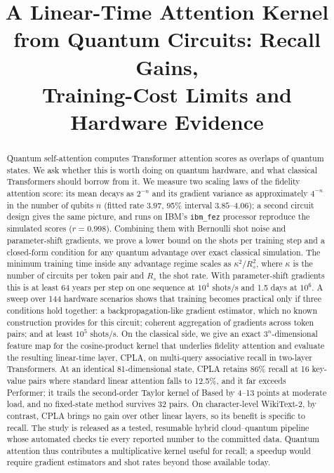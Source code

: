 \documentclass[conference]{IEEEtran}
\theoremstyle{definition}
\begin{document}
\title{A Linear-Time Attention Kernel\\from Quantum Circuits: Recall Gains,\\Training-Cost Limits and Hardware Evidence}

\author{
}

\maketitle

\begin{abstract}
Quantum self-attention computes Transformer attention scores as overlaps of quantum states. We ask whether this is worth doing on quantum hardware, and what classical Transformers should borrow from it. We measure two scaling laws of the fidelity attention score: its mean decays as $2^{-n}$ and its gradient variance as approximately $4^{-n}$ in the number of qubits $n$ (fitted rate $3.97$, 95\% interval $3.85$--$4.06$); a second circuit design gives the same picture, and runs on IBM's \texttt{ibm\_fez} processor reproduce the simulated scores ($r=0.998$). Combining them with Bernoulli shot noise and parameter-shift gradients, we prove a lower bound on the shots per training step and a closed-form condition for any quantum advantage over exact classical simulation. The minimum training time inside any advantage regime scales as $\kappa^2/R_s^2$, where $\kappa$ is the number of circuits per token pair and $R_s$ the shot rate. With parameter-shift gradients this is at least 64 years per step on one sequence at $10^4$ shots/s and 1.5 days at $10^6$. A sweep over 144 hardware scenarios shows that training becomes practical only if three conditions hold together: a backpropagation-like gradient estimator, which no known construction provides for this circuit; coherent aggregation of gradients across token pairs; and at least $10^5$ shots/s. On the classical side, we give an exact $3^n$-dimensional feature map for the cosine-product kernel that underlies fidelity attention and evaluate the resulting linear-time layer, CPLA, on multi-query associative recall in two-layer Transformers. At an identical 81-dimensional state, CPLA retains 86\% recall at 16 key-value pairs where standard linear attention falls to 12.5\%, and it far exceeds Performer; it trails the second-order Taylor kernel of Based by 4--13 points at moderate load, and no fixed-state method survives 32 pairs. On character-level WikiText-2, by contrast, CPLA brings no gain over other linear layers, so its benefit is specific to recall. The study is released as a tested, resumable hybrid cloud--quantum pipeline whose automated checks tie every reported number to the committed data. Quantum attention thus contributes a multiplicative kernel useful for recall; a speedup would require gradient estimators and shot rates beyond those available today.
\end{abstract}
\end{document}
